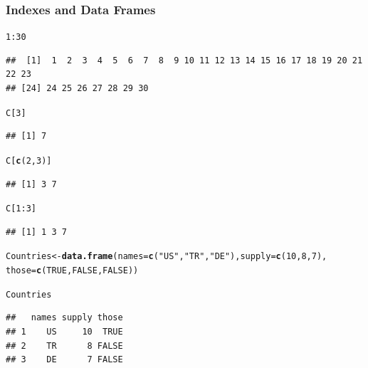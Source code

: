\documentclass{beamer}\usepackage[]{graphicx}\usepackage[]{color}
\makeatletter
\newcommand{\hlnum}[1]{\textcolor[rgb]{0.686,0.059,0.569}{#1}}%
\newcommand{\hlstr}[1]{\textcolor[rgb]{0.192,0.494,0.8}{#1}}%
\newcommand{\hlopt}[1]{\textcolor[rgb]{0,0,0}{#1}}%
\newcommand{\hlstd}[1]{\textcolor[rgb]{0.345,0.345,0.345}{#1}}%
\newcommand{\hlkwb}[1]{\textcolor[rgb]{0.69,0.353,0.396}{#1}}%
\newcommand{\hlkwc}[1]{\textcolor[rgb]{0.333,0.667,0.333}{#1}}%
\newcommand{\hlkwd}[1]{\textcolor[rgb]{0.737,0.353,0.396}{\textbf{#1}}}%
\newenvironment{kframe}{%
 \def\at@end@of@kframe{}%
 \ifinner\ifhmode%
  \def\at@end@of@kframe{\end{minipage}}%
  \begin{minipage}{\columnwidth}%
 \fi\fi%
 \def\FrameCommand##1{\hskip\@totalleftmargin \hskip-\fboxsep
 \colorbox{shadecolor}{##1}\hskip-\fboxsep
     \hskip-\linewidth \hskip-\@totalleftmargin \hskip\columnwidth}%
 \MakeFramed {\advance\hsize-\width
   \@totalleftmargin\z@ \linewidth\hsize
   \@setminipage}}%
 {\par\unskip\endMakeFramed%
 \at@end@of@kframe}
\newenvironment{knitrout}{}{} %
\makeatother
\begin{document}
\begin{frame}
\frametitle{Indexes and Data Frames}

\begin{knitrout}\scriptsize
{}\color{fgcolor}\begin{kframe}
\begin{alltt}
\hlnum{1}\hlopt{:}\hlnum{30}
\end{alltt}
\begin{verbatim}
##  [1]  1  2  3  4  5  6  7  8  9 10 11 12 13 14 15 16 17 18 19 20 21 22 23
## [24] 24 25 26 27 28 29 30
\end{verbatim}
\begin{alltt}
\hlstd{C[}\hlnum{3}\hlstd{]}
\end{alltt}
\begin{verbatim}
## [1] 7
\end{verbatim}
\begin{alltt}
\hlstd{C[}\hlkwd{c}\hlstd{(}\hlnum{2}\hlstd{,} \hlnum{3}\hlstd{)]}
\end{alltt}
\begin{verbatim}
## [1] 3 7
\end{verbatim}
\begin{alltt}
\hlstd{C[}\hlnum{1}\hlopt{:}\hlnum{3}\hlstd{]}
\end{alltt}
\begin{verbatim}
## [1] 1 3 7
\end{verbatim}
\end{kframe}
\end{knitrout}

\begin{knitrout}\scriptsize
{}\color{fgcolor}\begin{kframe}
\begin{alltt}
\hlstd{Countries} \hlkwb{<-} \hlkwd{data.frame}\hlstd{(}\hlkwc{names}\hlstd{=}\hlkwd{c}\hlstd{(}\hlstr{"US"}\hlstd{,}\hlstr{"TR"}\hlstd{,}\hlstr{"DE"}\hlstd{),} \hlkwc{supply}\hlstd{=}\hlkwd{c}\hlstd{(}\hlnum{10}\hlstd{,} \hlnum{8}\hlstd{,} \hlnum{7}\hlstd{),}
                        \hlkwc{those}\hlstd{=}\hlkwd{c}\hlstd{(}\hlnum{TRUE}\hlstd{,} \hlnum{FALSE}\hlstd{,} \hlnum{FALSE}\hlstd{))}

\hlstd{Countries}
\end{alltt}
\begin{verbatim}
##   names supply those
## 1    US     10  TRUE
## 2    TR      8 FALSE
## 3    DE      7 FALSE
\end{verbatim}
\end{kframe}
\end{knitrout}


\end{frame}
\end{document}
